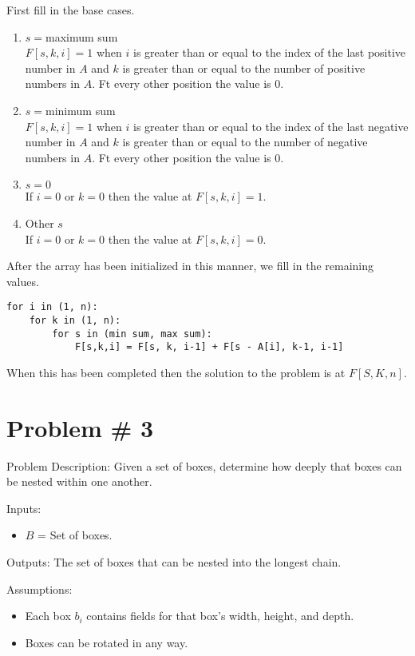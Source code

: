\documentclass{article}
\begin{document}
First fill in the base cases. 
\begin{enumerate}
    \item $s = $maximum sum\\
        $F[s, k, i] = 1$ when $i$ is greater than or equal to the index of the last positive number in $A$ and $k$ is greater than or equal to the number of positive numbers in $A$. Ft every other position the value is 0. 
    \item $s = $minimum sum\\
        $F[s, k, i] = 1$ when $i$ is greater than or equal to the index of the last negative number in $A$ and $k$ is greater than or equal to the number of negative numbers in $A$. Ft every other position the value is 0. 
    \item $s = 0$\\
        If $i = 0$ or $k = 0$ then the value at $F[s,k,i] = 1$. 

    \item Other $s$\\
        If $i=0$ or $k=0$ then the value at $F[s,k,i] = 0$. 

\end{enumerate}
After the array has been initialized in this manner, we fill in the remaining values.
\begin{lstlisting}
for i in (1, n):
    for k in (1, n):
        for s in (min sum, max sum):
            F[s,k,i] = F[s, k, i-1] + F[s - A[i], k-1, i-1]
\end{lstlisting}

When this has been completed then the solution to the problem is at $F[S, K, n]$.

\section*{Problem \# 3}
Problem Description: Given a set of boxes, determine how deeply that boxes can be nested within one another.

Inputs:
\begin{itemize}
    \item $B$ = Set of boxes.
\end{itemize}

Outputs: The set of boxes that can be nested into the longest chain.

Assumptions:
\begin{itemize}
    \item Each box $b_i$ contains fields for that box's width, height, and depth.
    \item Boxes can be rotated in any way.
\end{itemize}
\end{document}
